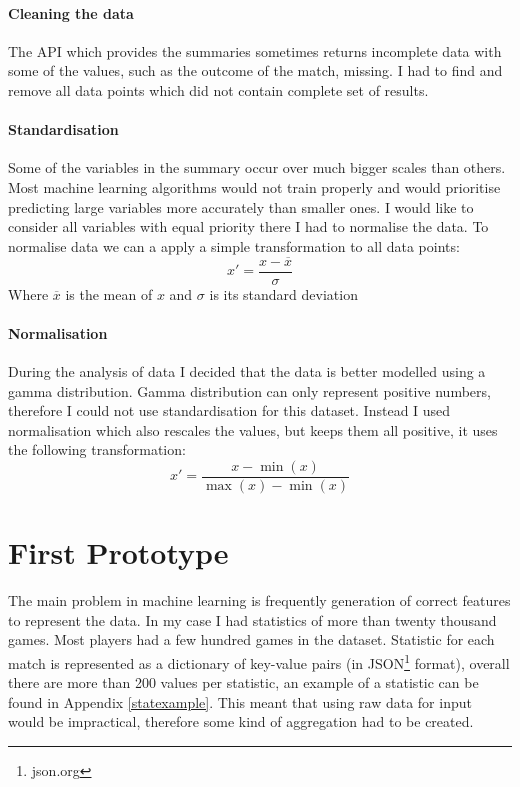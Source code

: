\documentclass[12pt,a4paper]{book}
\newcommand\mean[1]{\overline{#1}}
\begin{document}
\paragraph{Cleaning the data}
The API which provides the summaries sometimes returns incomplete data with some of the values, such as the outcome of the match, missing.
I had to find and remove all data points which did not contain complete set of results.
\paragraph{Standardisation}
Some of the variables in the summary occur over much bigger scales than others.
Most machine learning algorithms would not train properly and would prioritise predicting large variables more accurately than smaller ones.
I would like to consider all variables with equal priority there I had to normalise the data.
To normalise data we can a apply a simple transformation to all data points:
\begin{equation}
x' = \frac{x - \mean{x}}{\sigma}
\end{equation}
Where $\mean{x}$ is the mean of $x$ and $\sigma$ is its standard deviation
\paragraph{Normalisation}
During the analysis of data I decided that the data is better modelled using a gamma distribution.
Gamma distribution can only represent positive numbers, therefore I could not use standardisation for this dataset.
Instead I used normalisation which also rescales the values, but keeps them all positive, it uses the following transformation:
\begin{equation}
x' = \frac{x - \min(x)}{\max(x)-\min(x)}
\end{equation}
\section{First Prototype}
The main problem in machine learning is frequently generation of correct features to represent the data.
In my case I had statistics of more than twenty thousand games.
Most players had a few hundred games in the dataset.
Statistic for each match is represented as a dictionary of key-value pairs (in JSON\footnote{json.org} format), overall there are more than 200 values per statistic, an example of a statistic can be found in Appendix \ref{statexample}.
This meant that using raw data for input would be impractical, therefore some kind of aggregation had to be created.
\end{document}
